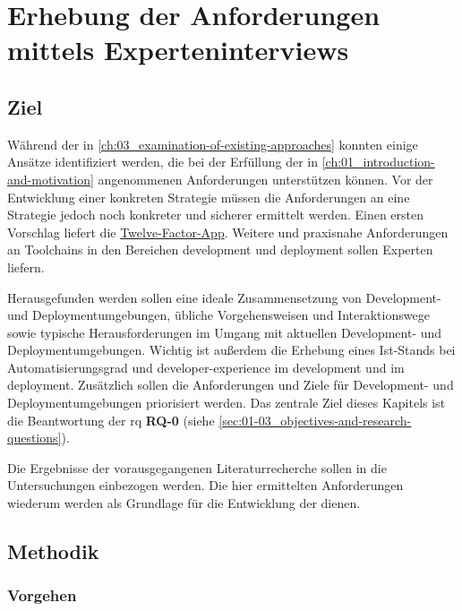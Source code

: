 \section{Erhebung der Anforderungen mittels Experteninterviews}
\label{sec:04-01_collection-of-requirements-using-expert-interviews}

\subsection{Ziel}
\label{subsec:04-01-01_goal}

Während der  in \autoref{ch:03_examination-of-existing-approaches} konnten einige Ansätze identifiziert werden, die bei der Erfüllung der in \autoref{ch:01_introduction-and-motivation} angenommenen Anforderungen unterstützen können. Vor der Entwicklung einer konkreten Strategie müssen die Anforderungen an eine  Strategie jedoch noch konkreter und sicherer ermittelt werden. Einen ersten Vorschlag liefert die \hyperref[sec:03-05_concept-of-twelve-factor-app]{Twelve-Factor-App}. Weitere und praxisnahe Anforderungen an Toolchains in den Bereichen \Gls{development} und \Gls{deployment} sollen Experten  liefern.

Herausgefunden werden sollen eine ideale Zusammensetzung von Development- und Deploymentumgebungen, übliche Vorgehensweisen und Interaktionswege sowie typische Herausforderungen im Umgang mit aktuellen Development- und Deploymentumgebungen. Wichtig ist außerdem die Erhebung eines Ist-Stands bei Automatisierungsgrad und \Gls{developer-experience} im \Gls{development} und im \Gls{deployment}. Zusätzlich sollen die Anforderungen und Ziele für Development- und Deploymentumgebungen priorisiert werden. Das zentrale Ziel dieses Kapitels ist die Beantwortung der \acrlong{rq} \textbf{RQ-0} (siehe \autoref{sec:01-03_objectives-and-research-questions}).

Die Ergebnisse der vorausgegangenen Literaturrecherche sollen in die Untersuchungen einbezogen werden. Die hier ermittelten Anforderungen wiederum werden als Grundlage für die Entwicklung der  dienen.

\subsection{Methodik}
\label{subsec:04-01-02_methodology}

\subsubsection{Vorgehen}
\label{subsubsec:04-01-02-01_procedure}

